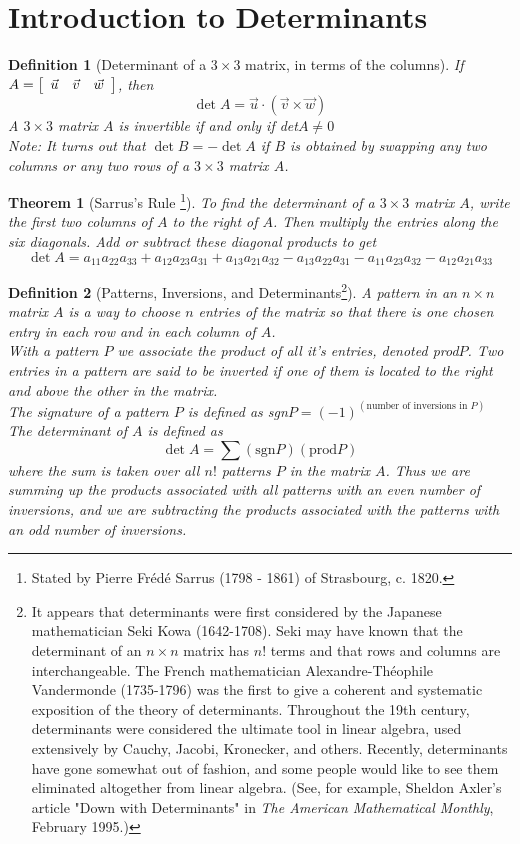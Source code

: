 \documentclass[10pt]{report}
\newtheorem{thm2}{Theorem}[section]
\newtheorem{def2}{Definition}[section]
\begin{document}
\section{Introduction to Determinants}
\begin{def2}[Determinant of a $3\times 3$ matrix, in terms of the columns]
If $A=\left[ \begin{array}{c c c}
\vec{u} & \vec{v} & \vec{w}
\end{array}\right]$, then
$$\det A = \vec{u}\cdot (\vec{v} \times \vec{w})$$
A $3\times 3$ matrix $A$ is invertible if and only if det$A\neq 0$
\\Note: It turns out that $\det B=-\det A$ if $B$ is obtained by swapping any two columns or any two rows of a $3\times 3$ matrix $A$.
\end{def2}
\begin{thm2}[Sarrus's Rule \footnote{Stated by Pierre Fr\'{e}d\'{e} Sarrus (1798 - 1861) of Strasbourg, c. 1820.}]
To find the determinant of a $3\times 3$ matrix $A$, write the first two columns of $A$ to the right of $A$. Then multiply the entries along the six diagonals. Add or subtract these diagonal products to get
$$\det A = a_{11}a_{22}a_{33} + a_{12}a_{23}a_{31} + a_{13}a_{21}a_{32} - a_{13}a_{22}a_{31} - a_{11}a_{23}a_{32} - a_{12}a_{21}a_{33}$$
\end{thm2}
\begin{def2}[Patterns, Inversions, and Determinants\footnote{It appears that determinants were first considered by the Japanese mathematician Seki Kowa (1642-1708). Seki may have known that the determinant of an $n\times n$ matrix has $n!$ terms and that rows and columns are interchangeable. The French mathematician Alexandre-Th\'{e}ophile Vandermonde (1735-1796) was the first to give a coherent and systematic exposition of the theory of determinants. Throughout the 19th century, determinants were considered the ultimate tool in linear algebra, used extensively by Cauchy, Jacobi, Kronecker, and others. Recently, determinants have gone somewhat out of fashion, and some people would like to see them eliminated altogether from linear algebra. (See, for example, Sheldon Axler's article "Down with Determinants" in \textit{The American Mathematical Monthly}, February 1995.)}]
A pattern in an $n\times n$ matrix $A$ is a way to choose $n$ entries of the matrix so that there is one chosen entry in each row and in each column of $A$.\\
With a pattern $P$ we associate the product of all it's entries, denoted prod$P$. Two entries in a pattern are said to be inverted if one of them is located to the right and above the other in the matrix.\\
The signature of a pattern $P$ is defined as sgn$P=(-1)^{(\text{number of inversions in }P)}$
The determinant of $A$ is defined as
$$\det A = \sum (\text{sgn}P)(\text{prod}P)$$
where the sum is taken over all $n!$ patterns $P$ in the matrix $A$. Thus we are summing up the products associated with all patterns with an even number of inversions, and we are subtracting the products associated with the patterns with an odd number of inversions.
\end{def2}
\end{document}

